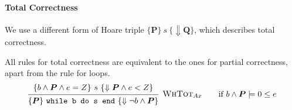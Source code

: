 \paragraph{Total Correctness}
We use a different form of Hoare triple $\{ \bm{P} \} \ s \ \{ \Downarrow \bm{Q} \}$, which describes total correctness.

All rules for total correctness are equivalent to the ones for partial correctness, apart from the rule for loops.
\[
    \begin{prooftree}
        \hypo{\{ b \land \bm{P} \land e = Z \} \ s \ \{ \Downarrow \bm{P} \land e < Z \}}
        \infer1[$\textsc{WhTot}_{Ax}$]{\{ \bm{P} \} \ \texttt{while b do s end} \ \{ \Downarrow \neg b \land \bm{P} \}}
    \end{prooftree}
    \qquad
    \text{if } b \land \bm{P} \models 0 \leq e
\]
